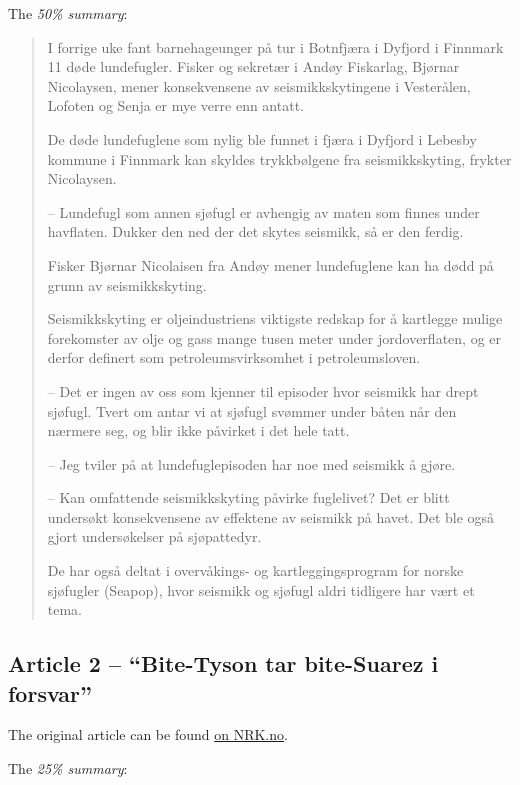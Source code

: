\documentclass[11pt,a4paper]{article}
\begin{document}
    The \emph{50\% summary}:

    \begin{quotation}
      I forrige uke fant barnehageunger på tur i Botnfjæra i Dyfjord i Finnmark 11 døde lundefugler.
      Fisker og sekretær i Andøy Fiskarlag, Bjørnar Nicolaysen, mener konsekvensene av seismikkskytingene i Vesterålen, Lofoten og Senja er mye verre enn antatt.

      De døde lundefuglene som nylig ble funnet i fjæra i Dyfjord i Lebesby kommune i Finnmark kan skyldes trykkbølgene fra seismikkskyting, frykter Nicolaysen.

      – Lundefugl som annen sjøfugl er avhengig av maten som finnes under havflaten. Dukker den ned der det skytes seismikk, så er den ferdig.

      Fisker Bjørnar Nicolaisen fra Andøy mener lundefuglene kan ha dødd på grunn av seismikkskyting.

      Seismikkskyting er oljeindustriens viktigste redskap for å kartlegge mulige forekomster av olje og gass mange tusen meter under jordoverflaten, og er derfor definert som petroleumsvirksomhet i petroleumsloven.

      – Det er ingen av oss som kjenner til episoder hvor seismikk har drept sjøfugl. Tvert om antar vi at sjøfugl svømmer under båten når den nærmere seg, og blir ikke påvirket i det hele tatt.

      – Jeg tviler på at lundefuglepisoden har noe med seismikk å gjøre.

      – Kan omfattende seismikkskyting påvirke fuglelivet? Det er blitt undersøkt konsekvensene av effektene av seismikk på havet. Det ble også gjort undersøkelser på sjøpattedyr.

      De har også deltat i overvåkings- og kartleggingsprogram for norske sjøfugler (Seapop), hvor seismikk og sjøfugl aldri tidligere har vært et tema.
    \end{quotation}


  \subsection{Article 2 -- ``Bite-Tyson tar bite-Suarez i forsvar''} %
  \label{sub:article_2}

    The original article can be found \href{http://www.nrk.no/sport/fotball/tyson-stotter-suarez-1.10997215}{on NRK.no}.

    The \emph{25\% summary}:
\end{document}
